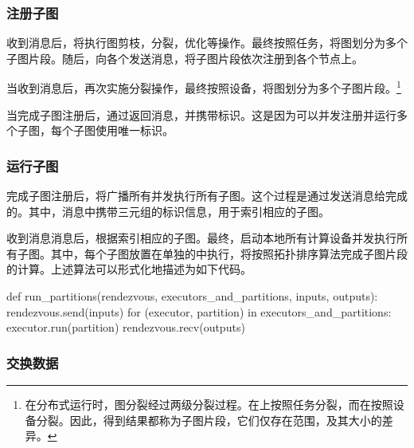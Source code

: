 \begin{content}
\subsubsection{注册子图}

收到消息后，将执行图剪枝，分裂，优化等操作。最终按照任务，将图划分为多个子图片段。随后，向各个发送消息，将子图片段依次注册到各个节点上。

当收到消息后，再次实施分裂操作，最终按照设备，将图划分为多个子图片段。\footnote{在分布式运行时，图分裂经过两级分裂过程。在上按照任务分裂，而在按照设备分裂。因此，得到结果都称为子图片段，它们仅存在范围，及其大小的差异。}

当完成子图注册后，通过返回消息，并携带标识。这是因为可以并发注册并运行多个子图，每个子图使用唯一标识。

\subsubsection{运行子图}

完成子图注册后，将广播所有并发执行所有子图。这个过程是通过发送消息给完成的。其中，消息中携带三元组的标识信息，用于索引相应的子图。

收到消息消息后，根据索引相应的子图。最终，启动本地所有计算设备并发执行所有子图。其中，每个子图放置在单独的中执行，将按照拓扑排序算法完成子图片段的计算。上述算法可以形式化地描述为如下代码。


\begin{leftbar}
  \begin{python}
def run_partitions(rendezvous, executors_and_partitions, inputs, outputs):
  rendezvous.send(inputs)
  for (executor, partition) in executors_and_partitions: 
    executor.run(partition)
  rendezvous.recv(outputs)
  \end{python}
\end{leftbar}

\subsubsection{交换数据}


\end{content}
